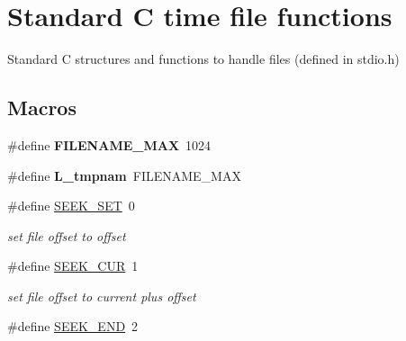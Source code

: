 \hypertarget{group__file}{\section{Standard C time file functions}
\label{group__file}
}


Standard C structures and functions to handle files (defined in stdio.\-h)  


\subsection*{Macros}
\begin{DoxyCompactItemize}
\item 
\hypertarget{group__file_gaada6f64b4a36eb39c9b4cfd44eef7b36}{\#define {\bfseries F\-I\-L\-E\-N\-A\-M\-E\-\_\-\-M\-A\-X}~1024}\label{group__file_gaada6f64b4a36eb39c9b4cfd44eef7b36}

\item 
\hypertarget{group__file_gad2560a07a7528c4975660f391320faca}{\#define {\bfseries L\-\_\-tmpnam}~F\-I\-L\-E\-N\-A\-M\-E\-\_\-\-M\-A\-X}\label{group__file_gad2560a07a7528c4975660f391320faca}

\item 
\hypertarget{group__file_ga0d112bae8fd35be772185b6ec6bcbe64}{\#define \hyperlink{group__file_ga0d112bae8fd35be772185b6ec6bcbe64}{S\-E\-E\-K\-\_\-\-S\-E\-T}~0}\label{group__file_ga0d112bae8fd35be772185b6ec6bcbe64}

\begin{DoxyCompactList}\small\item\em set file offset to offset \end{DoxyCompactList}\item 
\hypertarget{group__file_ga4c8d0b76b470ba65a43ca46a88320f39}{\#define \hyperlink{group__file_ga4c8d0b76b470ba65a43ca46a88320f39}{S\-E\-E\-K\-\_\-\-C\-U\-R}~1}\label{group__file_ga4c8d0b76b470ba65a43ca46a88320f39}

\begin{DoxyCompactList}\small\item\em set file offset to current plus offset \end{DoxyCompactList}\item 
\hypertarget{group__file_gad2a2e6c114780c3071efd24f16c7f7d8}{\#define \hyperlink{group__file_gad2a2e6c114780c3071efd24f16c7f7d8}{S\-E\-E\-K\-\_\-\-E\-N\-D}~2}\label{group__file_gad2a2e6c114780c3071efd24f16c7f7d8}


\end{DoxyCompactItemize}
